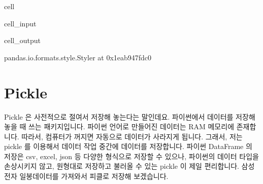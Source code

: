 \documentclass[letterpaper,10pt,english]{jupyterBook}
\begin{document}
\begin{sphinxuseclass}{cell}\begin{sphinxVerbatimInput}

\begin{sphinxuseclass}{cell_input}
\begin{sphinxVerbatim}[commandchars=\\\{\}]
  
\PYG{p}{[}\PYG{p}{]}\PYG{p}{[}\PYG{p}{]}
\end{sphinxVerbatim}

\end{sphinxuseclass}\end{sphinxVerbatimInput}
\begin{sphinxVerbatimOutput}

\begin{sphinxuseclass}{cell_output}
\begin{sphinxVerbatim}[commandchars=\\\{\}]
\PYGZlt{}pandas.io.formats.style.Styler at 0x1eab947fdc0\PYGZgt{}
\end{sphinxVerbatim}

\end{sphinxuseclass}\end{sphinxVerbatimOutput}

\end{sphinxuseclass}

\section{Pickle}
\label{\detokenize{chapter2/2.2.5_Useful_Techniques:pickle}}\label{\detokenize{chapter2/2.2.5_Useful_Techniques::doc}}
\sphinxAtStartPar
Pickle 은 사전적으로 절여서 저장해 놓는다는 말인데요. 파이썬에서 데이터를 저장해 놓을 때 쓰는 패키지입니다. 파이썬 언어로 만들어진 데이터는 RAM 메모리에 존재합니다. 따라서, 컴퓨터가 꺼지면 자동으로 데이터가 사라지게 됩니다. 그래서, 저는 pickle 를 이용해서 데이터 작업 중간에 데이터를 저장합니다. 파이썬 DataFrame 의 저장은 csv, excel, json 등 다양한 형식으로 저장할 수 있으나, 파이썬의 데이터 타입을 손상시키지 않고, 원형대로 저장하고 불러올 수 있는 pickle 이 제일 편리합니다. 삼성전자 일봉데이터를 가져와서 피클로 저장해 보겠습니다.
\end{document}
